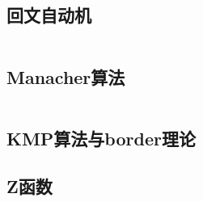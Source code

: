 \documentclass[12pt, a4paper, oneside]{ctexart}
\begin{document}
\begin{multicols}{2}
        \subsection{回文自动机}
        \inputminted{cpp}{src/string/PAM.cpp}
        \subsection{Manacher算法}
        \inputminted{cpp}{src/string/manacher.cpp}
        \subsection{KMP算法与border理论}
        
        \subsection{Z函数}
        
    \end{multicols}
\end{document}
